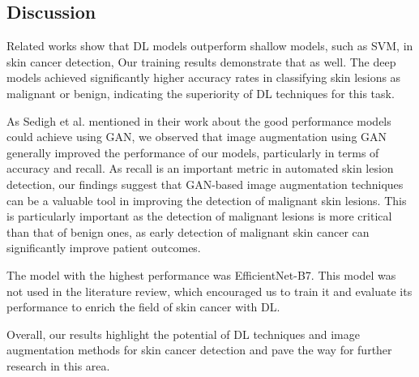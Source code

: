 \documentclass[12pt]{diazessay}
\begin{document}
    \subsection{Discussion}
    \-\hspace{0.7cm} Related works show that DL models outperform shallow models, such as SVM, in skin cancer detection, Our training results demonstrate that as well. The deep models achieved significantly higher accuracy rates in classifying skin lesions as malignant or benign, indicating the superiority of DL techniques for this task.
    
    As  Sedigh et al. \cite{Sedigh2019-ld} mentioned in their work about the good performance models could achieve using GAN, we observed that image augmentation using GAN generally improved the performance of our models, particularly in terms of accuracy and recall. As recall is an important metric in automated skin lesion detection, our findings suggest that GAN-based image augmentation techniques can be a valuable tool in improving the detection of malignant skin lesions. This is particularly important as the detection of malignant lesions is more critical than that of benign ones, as early detection of malignant skin cancer can significantly improve patient outcomes. 

    The model with the highest performance was EfficientNet-B7. This model was not used in the literature review, which encouraged us to train it and evaluate its performance to enrich the field of skin cancer with DL. 
    
    Overall, our results highlight the potential of DL techniques and image augmentation methods for skin cancer detection and pave the way for further research in this area.
    
\end{document}
